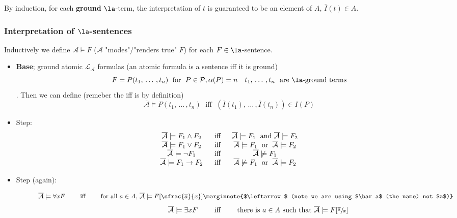 \noindent
By induction, for each \textbf{ground} $\la$-term, the interpretation of $t$ is guaranteed to be an element of $A$, $\overline I (t) \in A$.

\subsubsection{Interpretation of $\la$-sentences}

Inductively we define $\overline{\mathcal{A}} \models F$ ($\overline{\mathcal{A}}$ "modes"/"renders true" $F$) for each $F \in \la$-sentence.

\begin{itemize}
	\item \textbf{Base}; ground atomic $\mathcal{L}_\mathcal{A}$ formulas (an atomic formula is a sentence iff it is ground)
	$$ F = P (t_1, \, \dots \, , t_n)  \; \text{ for } \; P \in \mathcal{P}, \alpha(P) = n \quad t_1, \, \dots \, , t_n \ \ \text{are $\la$-ground terms} $$.
	Then we can define (remeber the iff is by definition)
	$$
	\overline{\mathcal{A}} \models P(t_1, \, \dots \, , t_n) \; \text{ iff } \; (\overline I (t_1), \, \dots \, , \overline I (t_n)) \in I (P)
	$$

	\item Step:
	$$
	\begin{array}{c c c}
		\overline{\mathcal{A}} \models F_1 \wedge F_2 & \; \text{ iff } \; & \overline{\mathcal{A}} \models F_1 \; \text{ and } \overline{\mathcal{A}} \models F_2 \\
		\overline{\mathcal{\mathcal{A}}} \models F_1 \vee F_2 & \; \text{ iff } \; & \overline{\mathcal{A}} \models F_1 \; \text{ or } \; \overline{\mathcal{A}} \models F_2 \\
		\overline{\mathcal{A}} \models \neg F_1 & \; \text{ iff } \; & \overline{\mathcal{A}} \not \models F_1 \\
		\overline{\mathcal{A}} \models F_1 \rightarrow F_2 & \; \text{ iff } \; & \overline{\mathcal{A}} \not \models F_1 \; \text{ or } \; \overline{\mathcal{A}} \models F_2
	\end{array}
	$$

	\item Step (again):

		$$ \quad\quad\quad \ \text{$\overline{\mathcal{A}} \models \forall x F$ \quad\quad iff \quad\quad for all $a \in A$, $\overline{\mathcal{A}} \models F [\sfrac{\overline a}{x}]$} \marginnote{$\leftarrow$ (note we are using $\bar a$ (the name) not $a$)}$$
		$$ \quad\quad\quad\quad\quad\quad\quad \ \ \, \ \text{$\overline{\mathcal{A}} \models \exists x F$ \quad\quad iff \quad\quad there is $a \in A$ such that $\overline{\mathcal{A}} \models F [\sfrac{\overline a}{x}]$} $$
\end{itemize}

